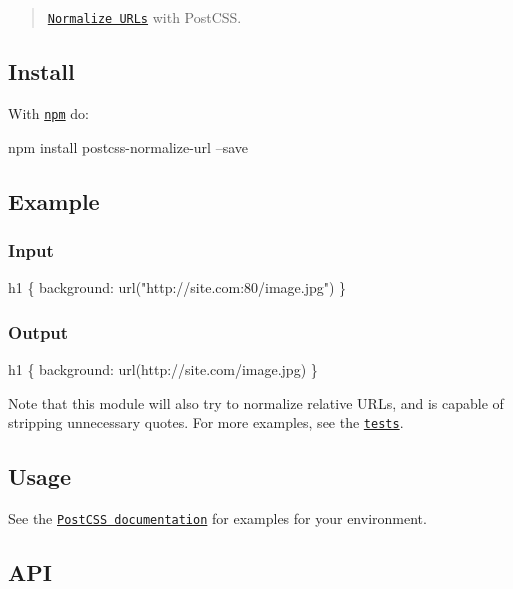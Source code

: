 \begin{quote}
\href{https://github.com/sindresorhus/normalize-url}{\tt Normalize U\+R\+Ls} with Post\+C\+SS. \end{quote}


\subsection*{Install}

With \href{https://npmjs.org/package/postcss-normalize-url}{\tt npm} do\+:


\begin{DoxyCode}
npm install postcss-normalize-url --save
\end{DoxyCode}


\subsection*{Example}

\subsubsection*{Input}


\begin{DoxyCode}
h1 \{
    background: url("http://site.com:80/image.jpg")
\}
\end{DoxyCode}


\subsubsection*{Output}


\begin{DoxyCode}
h1 \{
    background: url(http://site.com/image.jpg)
\}
\end{DoxyCode}


Note that this module will also try to normalize relative U\+R\+Ls, and is capable of stripping unnecessary quotes. For more examples, see the \href{test.js}{\tt tests}.

\subsection*{Usage}

See the \href{https://github.com/postcss/postcss#usage}{\tt Post\+C\+SS documentation} for examples for your environment.

\subsection*{A\+PI}

